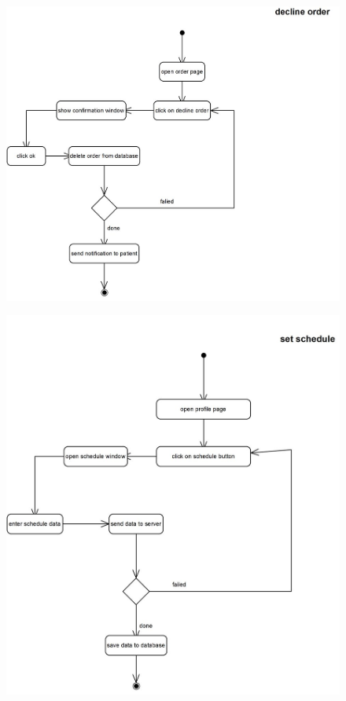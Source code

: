 \documentclass[]{article}
\begin{document}
\begin{figure}[H]
\centering
\includegraphics[scale=0.6]{./activity/12}
\end{figure}
\begin{figure}[H]
\centering
\includegraphics[scale=0.6]{./activity/13}
\end{figure}
\end{document}
